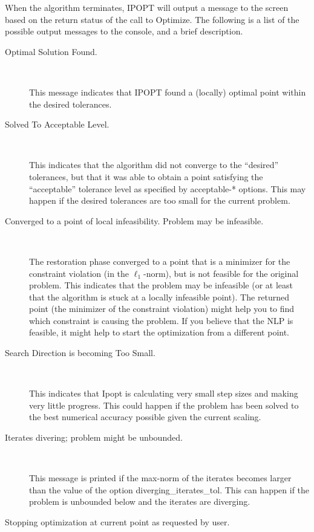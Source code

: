 When the algorithm terminates, IPOPT will output a message to the screen based on the return status of the call to Optimize.
The following is a list of the possible output messages to the console, and a brief description.

\begin{description}
\item[Optimal Solution Found.] ~

    This message indicates that IPOPT found a (locally) optimal point within the desired tolerances.

\item[Solved To Acceptable Level.] ~

    This indicates that the algorithm did not converge to the ``desired'' tolerances, but that it was able to obtain a point satisfying the ``acceptable'' tolerance level as specified by acceptable-* options.
    This may happen if the desired tolerances are too small for the current problem.

\item[Converged to a point of local infeasibility. Problem may be infeasible.] ~

    The restoration phase converged to a point that is a minimizer for the constraint violation (in the $\ell_1$-norm), but is not feasible for the original problem.
    This indicates that the problem may be infeasible (or at least that the algorithm is stuck at a locally infeasible point).
    The returned point (the minimizer of the constraint violation) might help you to find which constraint is causing the problem.
    If you believe that the NLP is feasible, it might help to start the optimization from a different point.

\item[Search Direction is becoming Too Small.] ~

    This indicates that Ipopt is calculating very small step sizes and making very little progress.
    This could happen if the problem has been solved to the best numerical accuracy possible given the current scaling.

\item[Iterates divering; problem might be unbounded.] ~

    This message is printed if the max-norm of the iterates becomes larger than the value of the option diverging\_iterates\_tol.
    This can happen if the problem is unbounded below and the iterates are diverging.

\item[Stopping optimization at current point as requested by user.] ~


\end{description}
